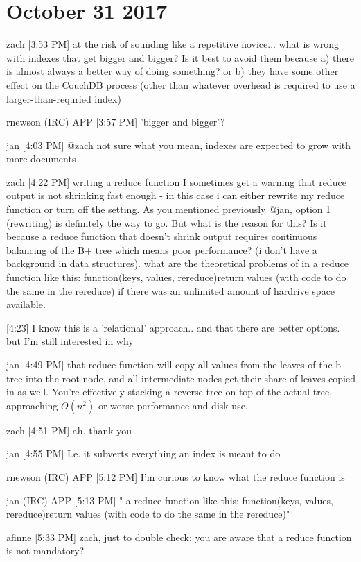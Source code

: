 \section{October 31 2017}
\label{slack-31-oct}
zach [3:53 PM]
at the risk of sounding like a repetitive novice... what is wrong with indexes that get bigger and bigger? Is it best to avoid them because a) there is almost always a better way of doing something? or b) they have some other effect on the CouchDB process (other than whatever overhead is required to use a larger-than-requried index)

rnewson (IRC) APP [3:57 PM]
'bigger and bigger'?

jan [4:03 PM]
@zach not sure what you mean, indexes are expected to grow with more documents

zach [4:22 PM]
writing a reduce function I sometimes get a warning that reduce output is not shrinking fast enough - in this case i can either rewrite my reduce function or turn off the setting. As you mentioned previously @jan, option 1 (rewriting) is definitely the way to go. But what is the reason for this? Is it because a reduce function that doesn't shrink output requires continuous balancing of the B+ tree which means poor performance? (i don't have a background in data structures). what are the theoretical problems of in a reduce function like this: function(keys, values, rereduce){return values (with code to do the same in the rereduce)} if there was an unlimited amount of hardrive space available.

[4:23]
I know this is a 'relational' approach.. and that there are better options. but I'm still interested in why

jan [4:49 PM]
that reduce function will copy all values from the leaves of the b-tree into the root node, and all intermediate nodes get their share of leaves copied in as well. You’re effectively stacking a reverse tree on top of the actual tree, approaching $ O(n^2) $ or worse performance and disk use.

zach [4:51 PM]
ah. thank you

jan [4:55 PM]
I.e. it subverts everything an index is meant to do

rnewson (IRC) APP [5:12 PM]
I'm curious to know what the reduce function is

jan (IRC) APP [5:13 PM]
" a reduce function like this: function(keys, values, rereduce){return values (with code to do the same in the rereduce)}"

afinne [5:33 PM]
zach, just to double check: you are aware that a reduce function is not mandatory?

